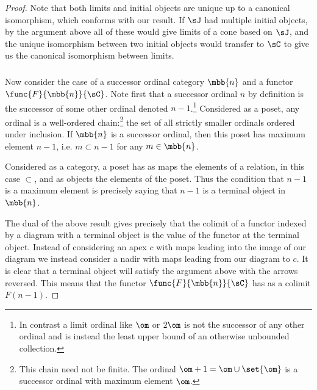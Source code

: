 \documentclass[main.tex]{subfiles}
\begin{document}
\begin{proof}
	Note that both limits and initial objects are unique up to a canonical
	isomorphism, which conforms with our result. If \(\sJ\) had multiple initial
	objects, by the argument above all of these would give limits of a cone
	based on \(\sJ\), and the unique isomorphism between two initial objects
	would transfer to \(\sC\) to give us the canonical isomorphism between
	limits.

	\subparagraph{}
	Now consider the case of a successor ordinal category \(\mbb{n}\) and a
	functor \(\func{F}{\mbb{n}}{\sC}\). Note first that a successor ordinal
	\(n\) by definition is the successor of some other ordinal denoted
	\(n-1\).\footnote{In contrast a limit ordinal
		like \(\om\) or \(2\om\) is not the successor of any other ordinal and
	is instead the least upper bound of an otherwise unbounded collection.}
	Considered as a poset, any ordinal is a well-ordered chain:\footnote{This
		chain need not be finite. The ordinal \(\om+1=\om\cup\set{\om}\) is a
	successor ordinal with maximum element \(\om\).} the set of all strictly
	smaller ordinals ordered under inclusion. If \(\mbb{n}\) is a successor
	ordinal, then this poset has maximum element \(n-1\), i.e. \(m\subset n-1\)
	for any \(m\in\mbb{n}\).

	Considered as a category, a poset has as maps the elements of a relation, in
	this case \(\subset\), and as objects the elements of the poset. Thus the
	condition that \(n-1\) is a maximum element is precisely saying that \(n-1\)
	is a terminal object in \(\mbb{n}\).

	The dual of the above result gives precisely that the colimit of a functor
	indexed by a diagram with a terminal object is the value of the functor at
	the terminal object. Instead of considering an apex \(c\) with maps leading
	into the image of our diagram we instead consider a nadir with maps leading
	from our diagram to \(c\). It is clear that a terminal object will satisfy
	the argument above with the arrows reversed. This means that the functor
	\(\func{F}{\mbb{n}}{\sC}\) has as a colimit \(F(n-1)\).
\end{proof}
\end{document}
